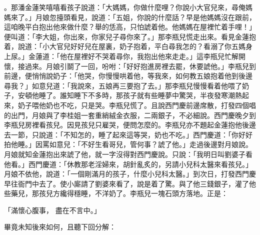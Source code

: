 \begin{showcontents}{}
。那潘金蓮笑嘻嘻看孩子說道：「大媽媽，你做什麼哩？你說小大官兒來，尋俺媽媽來了。」月娘忽擡頭看見，說道：「五姐，你說的什麼話？早是他媽媽沒在跟前，這咱晚平白抱出他來做什麼？舉的恁高，只怕諕着他。他媽媽在屋裡忙着手哩！」便叫道：「李大姐，你出來，你家兒子尋你來了。」那李瓶兒慌走出來。看見金蓮抱着，說道：「小大官兒好好兒在屋裏，奶子抱着，平白尋我怎的？看溺了你五媽身上尿。」金蓮道：「他在屋裡好不哭着尋你，我抱出他來走走。」這李瓶兒忙解開懷，接過來。月娘引鬬了一回，吩咐：「好好抱進房裡去罷，休要諕他。」李瓶兒到前邊，便悄悄說奶子：「他哭，你慢慢哄着他，等我來，如何教五娘抱着他到後邊尋我？」如意兒道：「我說來，五娘再三要抱了去。」那李瓶兒慢慢看着他喂了奶子，安頓他睡了。誰知睡下不多時，那孩子就有些睡夢中驚哭，半夜發寒潮熱起來，奶子喂他奶也不吃，只是哭。李瓶兒慌了。且說西門慶前邊席散，打發四個唱的出門，月娘與了李桂姐一套重綃絨金衣服，二兩銀子，不必細說。西門慶晚夕到李瓶兒房裡看孩兒。因見孩兒只雇哭，便問怎麼的。李瓶兒亦不題起金蓮抱他後邊去一節，只說道：「不知怎的，睡了起來這等哭，奶也不吃。」西門慶道：「你好好拍他睡。」因罵如意兒：「不好生看哥兒，管何事？諕了他。」走過後邊對月娘說。月娘就知金蓮抱出來諕了他，就一字沒得對西門慶說。只說：「我明日叫劉婆子看他看。」西門慶道：「休教那老淫婦來，胡針亂炙的，另請小兒科太醫來看孩兒。」月娘不依他，說道：「一個剛滿月的孩子，什麼小兒科太醫。」到次日，打發西門慶早往衙門中去了。使小廝請了劉婆來看了，說是着了驚。與了他三錢銀子，灌了他些藥兒，那孩兒方纔得穩睡，不洋奶了。李瓶兒一塊石頭方落地。正是：

「滿懷心腹事，  盡在不言中。」

畢竟未知後來如何，且聽下回分解：





\end{showcontents}


